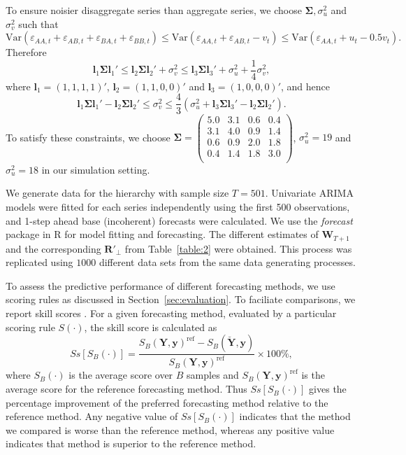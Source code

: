 \documentclass[a4paper, 11pt]{article}
\begin{document}
To ensure noisier disaggregate series than aggregate series, we choose $\bm{\Sigma}, \sigma^2_u$ and $\sigma^2_v$ such that
$$
\text{Var}(\varepsilon_{AA,t}+\varepsilon_{AB,t}+\varepsilon_{BA,t}+\varepsilon_{BB,t}) \le \text{Var}(\varepsilon_{AA,t}+\varepsilon_{AB,t}-v_t) \le \text{Var}(\varepsilon_{AA,t}+u_t-0.5v_t).
$$
Therefore
$$
\bm{l}_1\bm{\Sigma} \bm{l}_1' \le \bm{l}_2\bm{\Sigma} \bm{l}_2' + \sigma^2_v \le  \bm{l}_3\bm{\Sigma} \bm{l}_3' + \sigma^2_u + \frac{1}{4}\sigma^2_v,
$$
where $\bm{l}_1 = (1,1,1,1)'$, $\bm{l}_2 = (1,1,0,0)'$ and $\bm{l}_3 = (1,0,0,0)'$, and hence
$$\bm{l}_1\bm{\Sigma} \bm{l}_1' - \bm{l}_2\bm{\Sigma} \bm{l}_2' \le \sigma^2_v \le \frac{4}{3}(\sigma^2_u + \bm{l}_3\bm{\Sigma} \bm{l}_3' - \bm{l}_2\bm{\Sigma} \bm{l}_2').$$
To satisfy these constraints, we choose
$\bm{\Sigma} =
\begin{pmatrix}
5.0 & 3.1 & 0.6 & 0.4 \\
3.1 & 4.0 & 0.9 & 1.4 \\
0.6 & 0.9 & 2.0 & 1.8 \\
0.4 & 1.4 & 1.8 & 3.0 \\
\end{pmatrix}$,
$\sigma^2_u = 19$ and $\sigma^2_u = 18$ in our simulation setting.

We generate data for the hierarchy with sample size $T=501$. Univariate ARIMA models were fitted for each series independently using the first 500 observations, and 1-step ahead base (incoherent) forecasts were calculated. We use the \textit{forecast} package \citep{hyndman2017forecasting} in R \citep{Rcore} for model fitting and forecasting. The different estimates of $\bm{W}_{T+1}$ and the corresponding $\bm{R}'_\bot$ from Table~\ref{table:2} were obtained. This process was replicated using $1000$ different data sets from the same data generating processes.

To assess the predictive performance of different forecasting methods, we use scoring rules as discussed in Section~\ref{sec:evaluation}. To faciliate comparisons, we report skill scores \citep{Gneiting2007}. For a given forecasting method, evaluated by a particular scoring rule $S(\cdot)$, the skill score is calculated as
\begin{equation}
Ss[S_B(\cdot)] = \frac{S_B(\bm{Y},\bm{y})^{\text{ref}} - S_B(\breve{\bm{Y}},\bm{y})}{S_B(\bm{Y},\bm{y})^{\text{ref}}}\times 100\%,
\end{equation}
where $S_B(\cdot)$ is the average score over $B$ samples and $S_B(\bm{Y},\bm{y})^{\text{ref}}$ is the average score for the reference forecasting method. Thus $Ss[S_B(\cdot)]$ gives the percentage improvement of the preferred forecasting method relative to the reference method. Any negative value of $Ss[S_B(\cdot)]$ indicates that the method we compared is worse than the reference method, whereas any positive value indicates that method is superior to the reference method.
\end{document}
